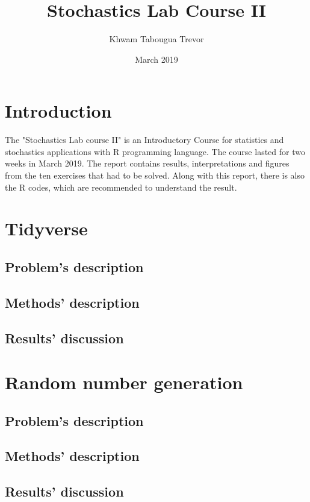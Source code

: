 \documentclass{report}
\title{\textbf{Stochastics Lab Course II}}
\author{Khwam Tabougua Trevor}
\date{March 2019}
\begin{document}
	
\maketitle

\chapter*{Introduction}

The "Stochastics Lab course II" is an Introductory Course for
statistics and stochastics applications with R programming language. The course lasted for two weeks in March 2019. The report contains results, interpretations and figures from the ten exercises that had to be solved. Along with this report, there is also the R codes, which are recommended to understand the result.

\tableofcontents
\chapter{Tidyverse}
\section{Problem's description}

\section{Methods' description}

\section{Results' discussion}


\chapter{Random number generation}
\section{Problem's description}

\section{Methods' description}

\section{Results' discussion}
\end{document}
